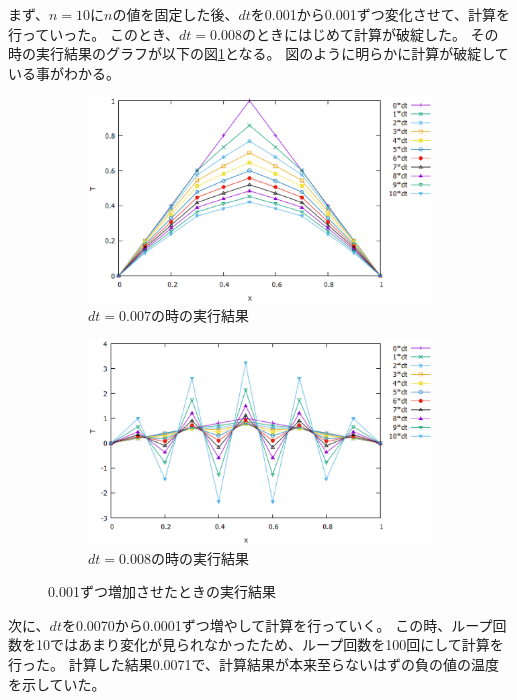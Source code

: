 \documentclass{jsarticle}
\begin{document}
まず、$n=10$に$n$の値を固定した後、$dt$を0.001から0.001ずつ変化させて、計算を行っていった。
このとき、$dt=0.008$のときにはじめて計算が破綻した。
その時の実行結果のグラフが以下の図\ref{fig02}となる。
図のように明らかに計算が破綻している事がわかる。
\begin{figure}[H]
	\centering
	\begin{subfigure}{0.9\columnwidth}
		\centering
		\includegraphics[width=\columnwidth]{pic02.eps}
		\caption{$dt=0.007$の時の実行結果}
	\end{subfigure}
	\begin{subfigure}{0.9\columnwidth}
		\centering
		\includegraphics[width=\columnwidth]{pic03.eps}
		\caption{$dt=0.008$の時の実行結果}
	\end{subfigure}
	\label{fig02}
	\caption{0.001ずつ増加させたときの実行結果}
\end{figure}
次に、$dt$を0.0070から0.0001ずつ増やして計算を行っていく。
この時、ループ回数を10ではあまり変化が見られなかったため、ループ回数を100回にして計算を行った。
計算した結果0.0071で、計算結果が本来至らないはずの負の値の温度を示していた。
\end{document}
